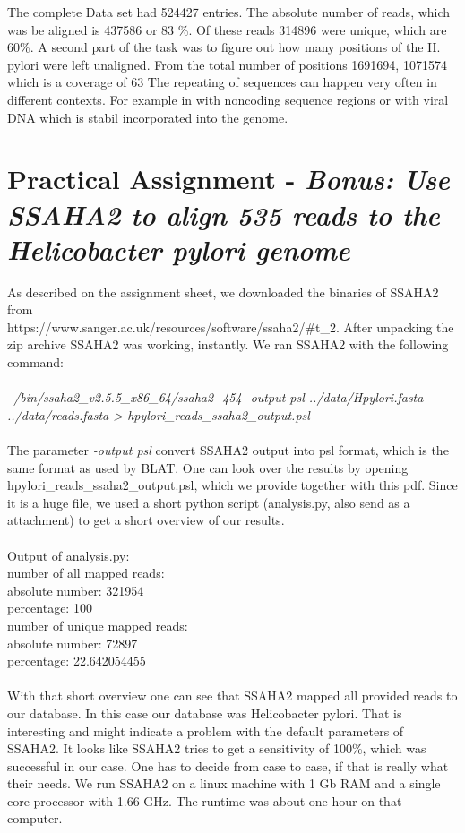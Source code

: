 \documentclass[%
   10pt,              %
   nenglish,           %
   a4paper,           %
   DIV11,             %
]{scrartcl}%
\begin{document}
The complete Data set had 524427 entries. The absolute number of reads, which was be aligned is  437586 or 83 \%. Of these reads 314896 were unique, which are 60\%.
A second part of the task was to figure out how many positions of the H. pylori were left unaligned. From the total number of positions 1691694, 1071574 which is a coverage of 63%
The repeating of sequences can happen very often in different contexts. For example in with noncoding sequence regions or with viral DNA which is stabil incorporated into the genome.

\section*{Practical Assignment - \textsl{Bonus: Use SSAHA2 to align 535 reads to the Helicobacter pylori genome}}
 
As described on the assignment sheet, we downloaded the binaries of SSAHA2 from \\
https://www.sanger.ac.uk/resources/software/ssaha2/\#t\_2. After unpacking the zip archive SSAHA2 was
working, instantly. We ran SSAHA2 with the following command: \\
\\
\textit{~/bin/ssaha2\_v2.5.5\_x86\_64/ssaha2 -454 -output psl  ../data/Hpylori.fasta ../data/reads.fasta > hpylori\_reads\_ssaha2\_output.psl} \\
\\
The parameter \textit{-output psl} convert SSAHA2 output into psl format, which is the same format 
as used by BLAT.
One can look over the results by opening hpylori\_reads\_ssaha2\_output.psl, which we provide together 
with this pdf. Since it is a huge file, we used a short python script (analysis.py, also send as a 
attachment) to get a short overview of our results. \\
\\
Output of analysis.py:\\
\indent number of all mapped reads:\\ 
    \indent\indent absolute number:  321954\\
    \indent\indent percentage:  100\\
\indent number of unique mapped reads:\\ 
    \indent\indent absolute number: 72897\\
    \indent\indent percentage:  22.642054455\\
\\
With that short overview one can see that SSAHA2 mapped all provided reads to our database. In 
this case our database was Helicobacter pylori. That is interesting and might indicate a problem with
the default parameters of SSAHA2. It looks like SSAHA2 tries to get a sensitivity of 100\%, which 
was successful in our case. One has to decide from case to case, if that is really what their needs.
We run SSAHA2 on a linux machine with 1 Gb RAM and a single core processor with 1.66 GHz. The runtime
was about one hour on that computer.

 
\end{document}
